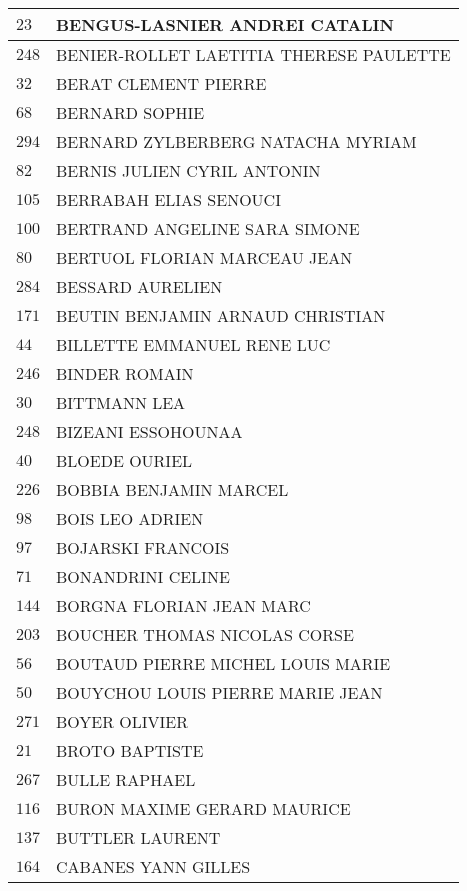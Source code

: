 \begin{xltabular}{\linewidth}{|l|X|}
    \hline
    $23$ & BENGUS-LASNIER ANDREI CATALIN \\
    \hline
    $248$ & BENIER-ROLLET LAETITIA THERESE PAULETTE \\
    \hline
    $32$ & BERAT CLEMENT PIERRE \\
    \hline
    $68$ & BERNARD SOPHIE \\
    \hline
    $294$ & BERNARD ZYLBERBERG NATACHA MYRIAM \\
    \hline
    $82$ & BERNIS JULIEN CYRIL ANTONIN \\
    \hline
    $105$ & BERRABAH ELIAS SENOUCI \\
    \hline
    $100$ & BERTRAND ANGELINE SARA SIMONE \\
    \hline
    $80$ & BERTUOL FLORIAN MARCEAU JEAN \\
    \hline
    $284$ & BESSARD AURELIEN \\
    \hline
    $171$ & BEUTIN BENJAMIN ARNAUD CHRISTIAN \\
    \hline
    $44$ & BILLETTE EMMANUEL RENE LUC \\
    \hline
    $246$ & BINDER ROMAIN \\
    \hline
    $30$ & BITTMANN LEA \\
    \hline
    $248$ & BIZEANI ESSOHOUNAA \\
    \hline
    $40$ & BLOEDE OURIEL \\
    \hline
    $226$ & BOBBIA BENJAMIN MARCEL \\
    \hline
    $98$ & BOIS LEO ADRIEN \\
    \hline
    $97$ & BOJARSKI FRANCOIS \\
    \hline
    $71$ & BONANDRINI CELINE \\
    \hline
    $144$ & BORGNA FLORIAN JEAN MARC \\
    \hline
    $203$ & BOUCHER THOMAS NICOLAS CORSE \\
    \hline
    $56$ & BOUTAUD PIERRE MICHEL LOUIS MARIE \\
    \hline
    $50$ & BOUYCHOU LOUIS PIERRE MARIE JEAN \\
    \hline
    $271$ & BOYER OLIVIER \\
    \hline
    $21$ & BROTO BAPTISTE \\
    \hline
    $267$ & BULLE RAPHAEL \\
    \hline
    $116$ & BURON MAXIME GERARD MAURICE \\
    \hline
    $137$ & BUTTLER LAURENT \\
    \hline
    $164$ & CABANES YANN GILLES \\

\end{xltabular}
